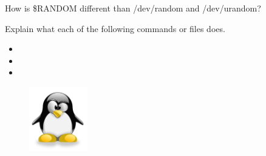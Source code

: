 \documentclass[letterpaper,12pt]{exam}
\begin{document}
\begin {questions}
\begin{samepage}
	\question How is \$RANDOM different than /dev/random and /dev/urandom?
	\vspace{5mm}
\end{samepage}

\begin{samepage}
\question Explain what each of the following commands or files does.
\begin{itemize}
	\item {}
	\item {}
	\item {}
\end{itemize}  

\end{samepage}

\end{questions}
\begin{figure}[b]\label{end}
	\center
	\includegraphics[width=1in]{tux}
\end{figure}
\end{document}
